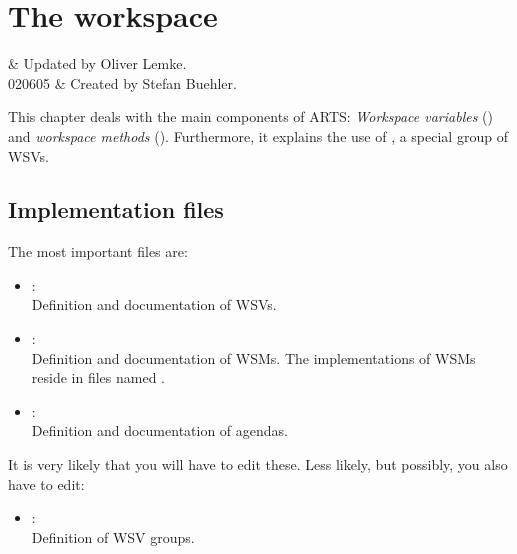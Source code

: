 
\chapter{The workspace}
\label{sec:workspace}

 & Updated by Oliver Lemke.\\
  020605 & Created by Stefan Buehler.\\
\stophistory

This chapter deals with the main components of ARTS: \emph{Workspace
  variables} () and
\emph{workspace methods} ().
Furthermore, it explains the use of , a special
group of WSVs.



\section{Implementation files}
\label{sec:agendas:files}

The most important files are:
\begin{itemize}
\item {}:\\
  Definition and documentation of WSVs.
\item{}:\\
  Definition and documentation of WSMs. The
  implementations of WSMs reside in files named
  .
\item {}:\\
  Definition and documentation of agendas.
\end{itemize}
It is very likely that you will have to edit these. Less likely, but
possibly, you also have to edit:
\begin{itemize}
\item {}:\\
  Definition of WSV groups.
\end{itemize}

